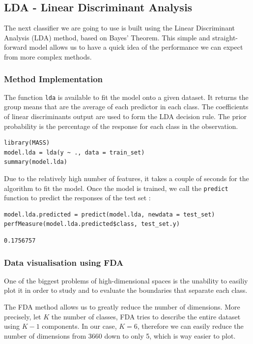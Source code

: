 \documentclass[]{report}
\begin{document}
\pagebreak

\subsection{LDA - Linear Discriminant Analysis}
The next classifier we are going to use is built using the Linear Discriminant Analysis (LDA) method, based on Bayes' Theorem. This simple and straight-forward model allows us to have a quick idea of the performance we can expect from more complex methods.  

\subsubsection{Method Implementation}
The function \texttt{lda} is available to fit the model onto a given dataset. It returns the group means that are the average of each predictor in each class. The coefficients of linear discriminants output are used to form the LDA decision rule. The prior probability is the percentage of the response for each class in the observation.

\begin{lstlisting}
library(MASS)
model.lda = lda(y ~ ., data = train_set)
summary(model.lda)
\end{lstlisting}

Due to the relatively high number of features, it takes a couple of seconds for the algorithm to fit the model.  Once the model is trained, we call the \texttt{predict} function to predict the responses of the test set : 

\begin{lstlisting}
model.lda.predicted = predict(model.lda, newdata = test_set)
perfMeasure(model.lda.predicted$class, test_set.y)
\end{lstlisting}

\begin{verbatim}
0.1756757
\end{verbatim}

\subsubsection{Data visualisation using FDA}
One of the biggest problems of high-dimensional spaces is the unability to easiliy plot it in order to study and to evaluate the boundaries that separate each class.

The FDA method allows us to greatly reduce the number of dimensions. More precisely, let $K$ the number of classes, FDA tries to describe the entire dataset using $K-1$ components. In our case, $K = 6$, therefore we can easily reduce the number of dimensions from 3660 down to only 5, which is way easier to plot.
\end{document}
